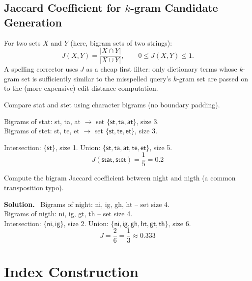 \documentclass[11pt, a4paper]{article}
\newcommand{\Solution}{\medskip\noindent\textbf{\color{exgreen}Solution.}\ }
\begin{document}
\subsection{Jaccard Coefficient for $k$-gram Candidate Generation}

\begin{formulabox}
For two sets $X$ and $Y$ (here, bigram sets of two strings):
\[
J(X,Y) = \frac{|X \cap Y|}{|X \cup Y|}, \qquad 0 \le J(X,Y) \le 1.
\]
A spelling corrector uses $J$ as a cheap first filter: only dictionary terms whose $k$-gram set is sufficiently similar to the misspelled query's $k$-gram set are passed on to the (more expensive) edit-distance computation.
\end{formulabox}

\begin{examplebox}
Compare \textsf{stat} and \textsf{stet} using character bigrams (no boundary padding).

Bigrams of \textsf{stat}: \textsf{st}, \textsf{ta}, \textsf{at} $\to$ set $\{\textsf{st},\textsf{ta},\textsf{at}\}$, size 3.\\
Bigrams of \textsf{stet}: \textsf{st}, \textsf{te}, \textsf{et} $\to$ set $\{\textsf{st},\textsf{te},\textsf{et}\}$, size 3.

Intersection: $\{\textsf{st}\}$, size 1. Union: $\{\textsf{st},\textsf{ta},\textsf{at},\textsf{te},\textsf{et}\}$, size 5.
\[
J(\textsf{stat},\textsf{stet}) = \frac{1}{5} = 0.2
\]
\end{examplebox}

\begin{exercisebox}
Compute the bigram Jaccard coefficient between \textsf{night} and \textsf{nigth} (a common transposition typo).
\end{exercisebox}

\Solution
Bigrams of \textsf{night}: \textsf{ni}, \textsf{ig}, \textsf{gh}, \textsf{ht} -- set size 4.\\
Bigrams of \textsf{nigth}: \textsf{ni}, \textsf{ig}, \textsf{gt}, \textsf{th} -- set size 4.\\
Intersection: $\{\textsf{ni},\textsf{ig}\}$, size 2. Union: $\{\textsf{ni},\textsf{ig},\textsf{gh},\textsf{ht},\textsf{gt},\textsf{th}\}$, size 6.
\[
J = \frac{2}{6} = \frac{1}{3} \approx 0.333
\]

\section{Index Construction}
\end{document}
